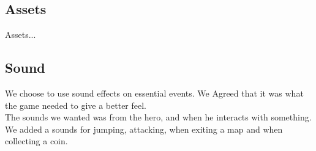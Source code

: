 \subsection{Assets}
Assets...

\subsection{Sound} %
We choose to use sound effects on essential events.
We Agreed that it was what the game needed to give a better feel.\\
The sounds we wanted was from the hero, and when he interacts with something.
We added a sounds for jumping, attacking, when exiting a map and when collecting a coin.\\